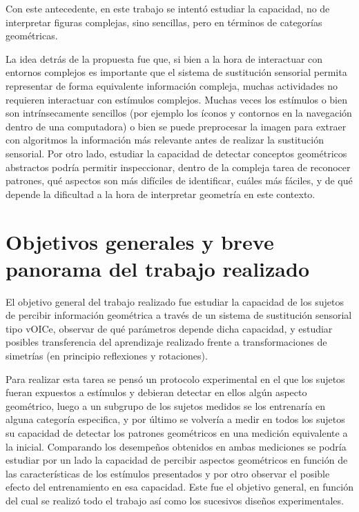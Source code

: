\documentclass{article}
\numberwithin{figure}{section}
\begin{document}
    Con este antecedente, en este trabajo se intentó estudiar la capacidad, no de interpretar figuras complejas, sino sencillas, pero en términos de categorías geométricas. 
    
    La idea detrás de la propuesta fue que, si bien a la hora de interactuar con entornos complejos es importante que el sistema de sustitución sensorial permita representar de forma equivalente información compleja, muchas actividades no requieren interactuar con estímulos complejos. Muchas veces los estímulos o bien son intrínsecamente sencillos (por ejemplo los íconos y contornos en la navegación dentro de una computadora) o bien se puede preprocesar la imagen para extraer con algoritmos la información más relevante antes de realizar la sustitución sensorial. Por otro lado, estudiar la capacidad de detectar conceptos geométricos abstractos podría permitir inspeccionar, dentro de la compleja tarea de reconocer patrones, qué aspectos son más difíciles de identificar, cuáles más fáciles, y de qué depende la dificultad a la hora de interpretar geometría en este contexto. 

\section{Objetivos generales y breve panorama del trabajo realizado} \label{seccion:panorama}

    El objetivo general del trabajo realizado fue estudiar la capacidad de los sujetos de percibir información geométrica a través de un sistema de sustitución sensorial tipo vOICe, observar de qué parámetros depende dicha capacidad, y estudiar posibles transferencia del aprendizaje realizado frente a transformaciones de simetrías (en principio reflexiones y rotaciones). 
    
    Para realizar esta tarea se pensó un protocolo experimental en el que los sujetos fueran expuestos a estímulos y debieran detectar en ellos algún aspecto geométrico, luego a un subgrupo de los sujetos medidos se los entrenaría en alguna categoría especifica, y por último se volvería a medir en todos los sujetos su capacidad de detectar los patrones geométricos en una medición equivalente a la inicial. Comparando los desempeños obtenidos en ambas mediciones se podría estudiar por un lado la capacidad de percibir aspectos geométricos en función de las características de los estímulos presentados y por otro observar el posible efecto del entrenamiento en esa capacidad. Este fue el objetivo general, en función del cual se realizó todo el trabajo así como los sucesivos diseños experimentales. 
    
\end{document}
